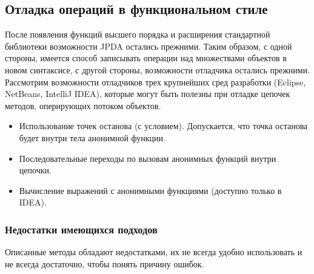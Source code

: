 \subsection{Отладка операций в функциональном стиле}
После появления функций высшего порядка и расширения стандартной библиотеки возможности JPDA остались прежними. Таким образом, с одной стороны, имеется способ записывать операции над множествами объектов в новом синтаксисе, с другой стороны, возможности отладчика остались прежними. Рассмотрим возможности отладчиков трех крупнейших сред разработки (Eclipse, NetBeans, IntelliJ IDEA), которые могут быть полезны при отладке цепочек методов, оперирующих потоком объектов.

\begin{itemize}
	\item Использование точек останова (с условием). Допускается, что точка останова будет внутри тела анонимной функции.
	\item Последовательные переходы по вызовам анонимных функций внутри цепочки.
	\item Вычисление выражений с анонимными функциями (доступно только в IDEA).
\end{itemize}

\subsubsection{Недостатки имеющихся подходов}
Описанные методы обладают недостатками, их не всегда удобно использовать и не всегда достаточно, чтобы понять причину ошибок.


